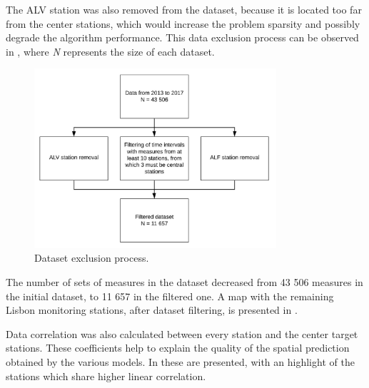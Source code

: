 The \ac{ALV} station was also removed from the dataset, because it is located too far from the center stations, which would increase the problem sparsity and possibly degrade the algorithm performance. This data exclusion process can be observed in , where \textit{N} represents the size of each dataset.

\begin{figure}[ht]
\centering
\includegraphics[width=0.8\textwidth]{./Images/dataset-filtering.jpeg}
\caption{Dataset exclusion process.}
\label{fig:dataset-filtering}
\end{figure}

The number of sets of measures in the dataset decreased from 43 506 measures in the initial dataset, to 11 657 in the filtered one. A map with the remaining Lisbon monitoring stations, after dataset filtering, is presented in . 

Data correlation was also calculated between every station and the center target stations. These coefficients help to explain the quality of the spatial prediction obtained by the various models. In  these are presented, with an highlight of the stations which share higher linear correlation.

